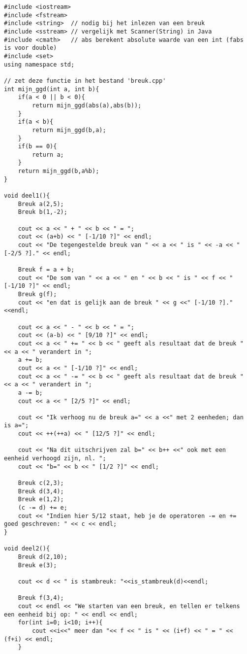 \begin{footnotesize} 
\begin{verbatim}
#include <iostream>
#include <fstream>
#include <string>  // nodig bij het inlezen van een breuk
#include <sstream> // vergelijk met Scanner(String) in Java
#include <cmath>   // abs berekent absolute waarde van een int (fabs is voor double)
#include <set>
using namespace std;  

// zet deze functie in het bestand 'breuk.cpp'
int mijn_ggd(int a, int b){
    if(a < 0 || b < 0){
        return mijn_ggd(abs(a),abs(b));
    }
    if(a < b){
        return mijn_ggd(b,a);
    }
    if(b == 0){
        return a;
    }
    return mijn_ggd(b,a%b);
}
      
void deel1(){    
    Breuk a(2,5);
    Breuk b(1,-2);

    cout << a << " + " << b << " = ";
    cout << (a+b) << " [-1/10 ?]" << endl;   
    cout << "De tegengestelde breuk van " << a << " is " << -a << " [-2/5 ?]." << endl;
    
    Breuk f = a + b;
    cout << "De som van " << a << " en " << b << " is " << f << " [-1/10 ?]" << endl;
    Breuk g(f);
    cout << "en dat is gelijk aan de breuk " << g <<" [-1/10 ?]."<<endl;
    
    cout << a << " - " << b << " = ";
    cout << (a-b) << " [9/10 ?]" << endl;
    cout << a << " += " << b << " geeft als resultaat dat de breuk " << a << " verandert in ";
    a += b;
    cout << a << " [-1/10 ?]" << endl;
    cout << a << " -= " << b << " geeft als resultaat dat de breuk " << a << " verandert in ";
    a -= b;
    cout << a << " [2/5 ?]" << endl;    
    
    cout << "Ik verhoog nu de breuk a=" << a <<" met 2 eenheden; dan is a=";
    cout << ++(++a) << " [12/5 ?]" << endl;
        
    cout << "Na dit uitschrijven zal b=" << b++ <<" ook met een eenheid verhoogd zijn, nl. ";
    cout << "b=" << b << " [1/2 ?]" << endl;
        
    Breuk c(2,3);
    Breuk d(3,4);
    Breuk e(1,2);
    (c -= d) += e;
    cout << "Indien hier 5/12 staat, heb je de operatoren -= en += goed geschreven: " << c << endl; 
}

void deel2(){
    Breuk d(2,10);
    Breuk e(3);
    
    cout << d << " is stambreuk: "<<is_stambreuk(d)<<endl;

    Breuk f(3,4);
    cout << endl << "We starten van een breuk, en tellen er telkens een eenheid bij op: " << endl << endl;
    for(int i=0; i<10; i++){
        cout <<i<<" meer dan "<< f << " is " << (i+f) << " = " << (f+i) << endl;    
    }
    

\end{verbatim}
\end{footnotesize}

